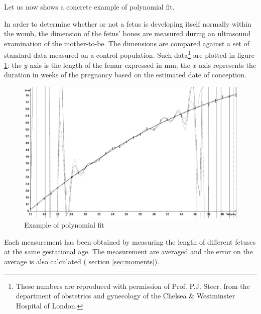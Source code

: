 \noindent Let us now shows a concrete example of polynomial fit.

In order to determine whether or not a fetus is developing itself
normally within the womb, the dimension of the fetus' bones are
measured during an ultrasound examination of the mother-to-be. The
dimensions are compared against a set of standard data measured on
a control population. Such data\footnote{These numbers are
reproduced with permission of Prof. P.J. Steer. from the
department of obstetrics and gynecology of the Chelsea $\&$
Westminster Hospital of London.} are plotted in figure
\ref{fig:femurLength}: the $y$-axis is the length of the femur
expressed in mm; the $x$-axis represents the duration in weeks of
the pregnancy based on the estimated date of conception.
\begin{figure}
\centering\includegraphics[width=12cm]{Figures/FemurLength}
\caption{Example of polynomial fit} \label{fig:femurLength}
\end{figure}
Each measurement has been obtained by measuring the length of
different fetuses at the same gestational age. The measurement are
averaged and the error on the average is also calculated (\cf
section \ref{sec:moments}).

